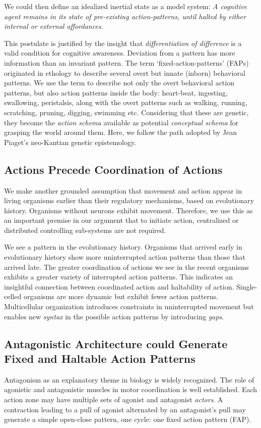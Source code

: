 We could then define an idealized inertial state as a model system:  \textit{A cognitive agent remains in its state of pre-existing action-patterns, until halted by either internal or external affordances.} 

This postulate is justified by the insight that \textit{differentiation of difference} is a valid condition for cognitive awareness.\cite{bateson2000steps} Deviation from a pattern has more information than an invariant pattern. The term `fixed-action-patterns' (FAPs) originated in ethology to describe several overt but innate (inborn) behavioral patterns. We use the term to describe not only the overt behavioral action patterns, but also action patterns inside the body: heart-beat, ingesting, swallowing, peristalsis, along with the overt patterns such as walking, running, scratching, pruning, digging, swimming etc.  Considering that these are genetic, they become the \textit{action schema} available as potential \textit{conceptual schema} for grasping the world around them.  Here, we follow the path adopted by Jean Piaget's neo-Kantian genetic epistemology.\cite{piaget-biology-knowledge}

\subsection{Actions Precede Coordination of Actions}

We make another grounded assumption that movement and action appear in living organisms earlier than their regulatory mechanisms, based on evolutionary history.  Organisms without neurons exhibit movement. Therefore, we use this as an important premise in our argument that to initiate action, centralized or distributed controlling sub-systems are not required.  

We see a pattern in the evolutionary history.  Organisms that arrived early in evolutionary history show more uninterrupted action patterns than those that arrived late. The greater coordination of actions we see in the recent organisms exhibits a greater variety of interrupted action patterns. This indicates an insightful connection between coordinated action and haltability of action. Single-celled organisms are more dynamic but exhibit fewer action patterns. Multicellular organization introduces constraints in uninterrupted movement but enables new \textit{syntax} in the possible action patterns by introducing \textit{gaps}.  

\subsection{Antagonistic Architecture could Generate Fixed and Haltable Action Patterns}
Antagonism as an explanatory theme in biology is widely recognized. The role of agonistic and antagonistic muscles in motor coordination is well established. Each action zone may have multiple sets of agonist and antagonist \textit{actors}.  A contraction leading to a pull of agonist alternated by an antagonist's pull may generate a simple open-close pattern, one cycle: one fixed action pattern (FAP). 

